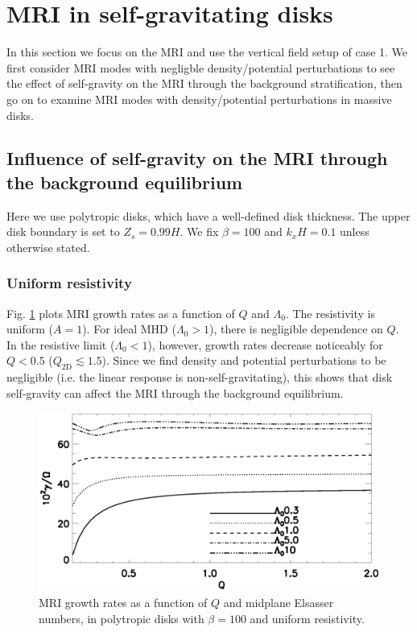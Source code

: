 \section{MRI in self-gravitating disks}\label{result1}
In this section we focus on the MRI and use the vertical field setup
of case 1. We first consider MRI modes with negligble density/potential
perturbations to see the effect of self-gravity on the MRI through the
background stratification, then go on to examine MRI modes with
density/potential perturbations in massive disks.  

\subsection{Influence of self-gravity on the MRI through the
  background equilibrium}
Here we use polytropic disks, which have a well-defined disk
thickness. The upper disk boundary is set to $Z_s=0.99H$. We fix
$\beta=100$ and $k_xH=0.1$ unless otherwise stated. 

\subsubsection{Uniform
  resistivity}   
Fig. \ref{compare_growth_poly_uniresis} plots MRI growth rates as a
function of $Q$ and $\Lambda_0$. The resistivity is uniform ($A=1$). 
For ideal MHD ($\Lambda_0>1$), there is negligible dependence on
$Q$. In the resistive limit   
($\Lambda_0<1$), however, growth rates decrease noticeably for $Q<0.5$
($Q_\mathrm{2D}\lesssim 1.5$).  Since we find density and potential
perturbations to be negligible (i.e. the linear response is
non-self-gravitating), this shows that disk self-gravity can affect the
MRI through the background equilibrium.

\begin{figure}
  \includegraphics[width=\linewidth]{figures/compare_growth_poly_uniresis2}
  \caption{MRI growth rates as a function of $Q$ and midplane 
    Elsasser numbers, in polytropic disks with $\beta=100$ and uniform
    resistivity.  
    \label{compare_growth_poly_uniresis}}
\end{figure}

